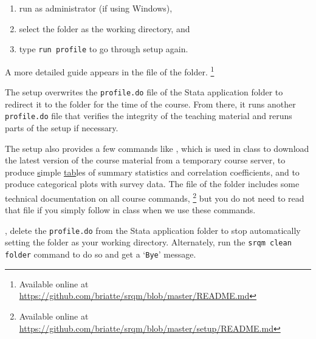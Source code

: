 		\begin{enumerate}
			\item run as administrator (if using Windows),
			\item select the \SRQM folder as the working directory, and
			\item type \texttt{run profile} to go through setup again.
		\end{enumerate}
	
	A more detailed guide appears in the \README file of the \SRQM folder.%
    \footnote{Available online at \url{https://github.com/briatte/srqm/blob/master/README.md}}%
  
	The setup overwrites the \texttt{profile.do} file of the Stata application folder to redirect it to the \SRQM folder for the time of the course. From there, it runs another \texttt{profile.do} file that verifies the integrity of the teaching material and reruns parts of the setup if necessary.%
		
	The setup also provides a few commands like , which is used in class to download the latest version of the course material from a temporary course server,  to produce \underline{s}imple \underline{tab}les of summary statistics and correlation coefficients, and  to produce categorical plots with survey data. %
		The \README file of the \setup folder includes some technical documentation on all course commands,%
	  \footnote{Available online at %
			\url{https://github.com/briatte/srqm/blob/master/setup/README.md}} %
		but you do not need to read that file if you simply follow in class when we use these commands.%
		
  , delete the \texttt{profile.do} from the Stata application folder to stop automatically setting the \SRQM folder as your working directory. Alternately, run the \texttt{srqm clean folder} command to do so and get a `\texttt{Bye}' message.%
